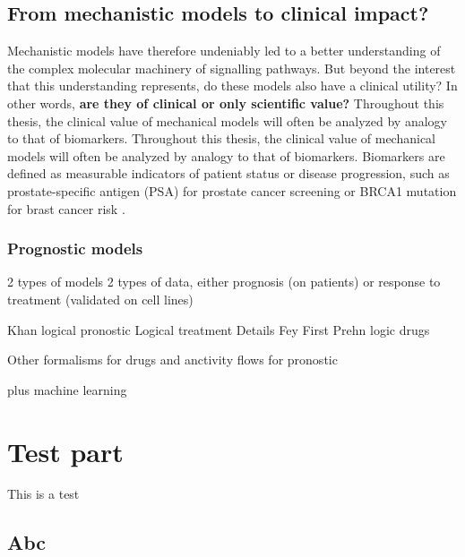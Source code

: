 \documentclass[a4paper,12pt,twoside,onecolumn,openright,final,oldfontcommands]{memoir}
\begin{document}
\section{From mechanistic models to clinical
impact?}\label{from-mechanistic-models-to-clinical-impact}

Mechanistic models have therefore undeniably led to a better
understanding of the complex molecular machinery of signalling pathways.
But beyond the interest that this understanding represents, do these
models also have a clinical utility? In other words, \textbf{are they of
clinical or only scientific value?} Throughout this thesis, the clinical
value of mechanical models will often be analyzed by analogy to that of
biomarkers. Throughout this thesis, the clinical value of mechanical
models will often be analyzed by analogy to that of biomarkers.
Biomarkers are defined as measurable indicators of patient status or
disease progression, such as prostate-specific antigen (PSA) for
prostate cancer screening or BRCA1 mutation for brast cancer risk
\citep{henry2012cancer}. \citep{oldenhuis2008prognostic}

\subsection{Prognostic models}\label{prognostic-models}

2 types of models 2 types of data, either prognosis (on patients) or
response to treatment (validated on cell lines)

Khan logical pronostic \citep{khan2017unraveling} Logical
treatment\citep{zanudo2017network} Details Fey \citep{fey2015signaling}
First Prehn \citep{hector2012clinical} \citep{salvucci2017stepwise}
\citep{frohlich2018efficient} logic drugs \citep{knijnenburg2016logic}

Other formalisms for drugs \citep{jastrzebski2018integrative} and
anctivity flows for pronostic \citep{hidalgo2017high}

plus machine learning \citep{salvucci2019machine}

\chapter{Test part}\label{test}

This is a test

\section{Abc}\label{abc}
\end{document}
